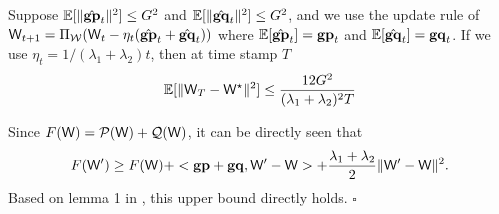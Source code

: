 \documentclass{article} %
\newcommand{\cW}{{\bf \mathsf{W}}}
\newcommand{\cE}{{\mathbb{E}}}
\newcommand{\aP}{{\mathcal{P}}}
\newcommand{\aQ}{{\mathcal{Q}}}
\newcommand{\gp}{{\bf gp}}
\newcommand{\gq}{{\bf gq}}
\newenvironment{proof}[1][Proof]{\begin{trivlist}
\item[\hskip \labelsep {\bfseries #1}]}{\end{trivlist}}
\begin{document}
{\lemma \label{lm:2}
Suppose $\cE[\lVert \hat{\gp}_t \rVert^2] \le G^2$ and $\cE[\lVert \hat{\gq}_t \rVert^2] \le G^2$, and we use the update rule of $\cW_{t+1} = \Pi_{\mathcal{W}}(\cW_{t} - \eta_t (\hat{\gp}_t+\hat{\gq}_t))$ where $\cE[\hat{\gp}_t]=\gp_t$ and $\cE[\hat{\gq}_t]=\gq_t$. If we use $\eta_t=1/(\lambda_1+\lambda_2)t$, then at time stamp $T$
\begin{equation}
\cE[\lVert \cW_T - \cW^{\star} \rVert^2] \le \frac{12G^2}{(\lambda_1+\lambda_2)^2 T}
\end{equation}
}
\begin{proof}
Since $F(\cW) = \aP(\cW) + \aQ(\cW)$, it can be directly seen that
\[
     F(\cW') \ge F(\cW) + <\gp+\gq, \cW'-\cW> + \frac{\lambda_1+\lambda_2}{2} \lVert \cW'-\cW \rVert^2.
\]
Based on lemma 1 in \cite{Rakhlin12}, this upper bound directly holds. \hfill $\square$

\end{proof}
\end{document}
